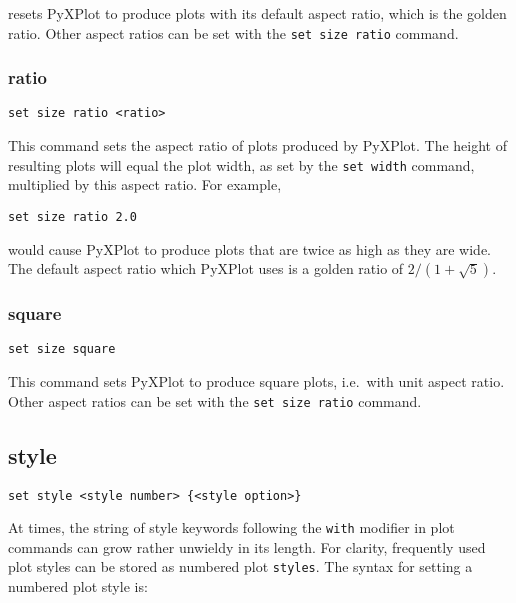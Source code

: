 \noindent resets PyXPlot to produce plots with its default aspect ratio, which
is the golden ratio. Other aspect ratios can be set with the {\tt set size
ratio} command.


\subsubsection{ratio}

\begin{verbatim}
set size ratio <ratio>
\end{verbatim}

This command sets the aspect ratio of plots produced by PyXPlot.  The height of
resulting plots will equal the plot width, as set by the {\tt set width}
command, multiplied by this aspect ratio.  For example,

\begin{verbatim}
set size ratio 2.0
\end{verbatim}

\noindent would cause PyXPlot to produce plots that are twice as high as they
are wide.  The default aspect ratio which PyXPlot uses is a golden ratio of
$2/(1+\sqrt{5})$.


\subsubsection{square}

\begin{verbatim}
set size square
\end{verbatim}

This command sets PyXPlot to produce square plots, i.e.\ with unit aspect
ratio. Other aspect ratios can be set with the {\tt set size ratio} command.


\subsection{style}

\begin{verbatim}
set style <style number> {<style option>}
\end{verbatim}

At times, the string of style keywords following the {\tt with} modifier in
plot commands can grow rather unwieldy in its length. For clarity, frequently
used plot styles can be stored as numbered plot {\tt styles}. The syntax for
setting a numbered plot style is:

